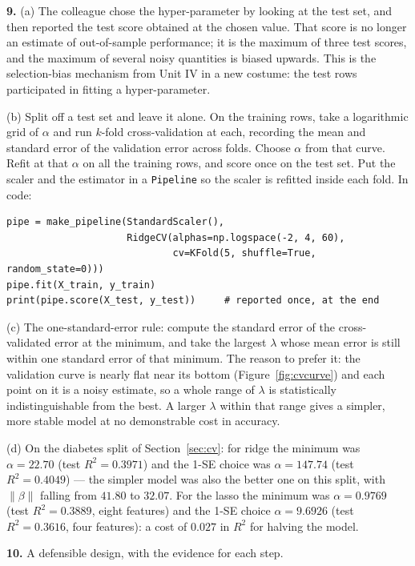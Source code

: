 \documentclass[11pt]{article}
\begin{document}
\medskip
\textbf{9.} (a) The colleague chose the hyper-parameter by looking at the test
set, and then reported the test score obtained at the chosen value. That score
is no longer an estimate of out-of-sample performance; it is the maximum of
three test scores, and the maximum of several noisy quantities is biased
upwards. This is the selection-bias mechanism from Unit IV in a new costume:
the test rows participated in fitting a hyper-parameter.

(b) Split off a test set and leave it alone. On the training rows, take a
logarithmic grid of $\alpha$ and run $k$-fold cross-validation at each,
recording the mean and standard error of the validation error across folds.
Choose $\alpha$ from that curve. Refit at that $\alpha$ on all the training
rows, and score once on the test set. Put the scaler and the estimator in a
\texttt{Pipeline} so the scaler is refitted inside each fold. In code:
\begin{lstlisting}
pipe = make_pipeline(StandardScaler(),
                     RidgeCV(alphas=np.logspace(-2, 4, 60),
                             cv=KFold(5, shuffle=True, random_state=0)))
pipe.fit(X_train, y_train)
print(pipe.score(X_test, y_test))     # reported once, at the end
\end{lstlisting}

(c) The one-standard-error rule: compute the standard error of the
cross-validated error at the minimum, and take the largest $\lambda$ whose
mean error is still within one standard error of that minimum. The reason to
prefer it: the validation curve is nearly flat near its bottom
(Figure~\ref{fig:cvcurve}) and each point on it is a noisy estimate, so a
whole range of $\lambda$ is statistically indistinguishable from the best. A
larger $\lambda$ within that range gives a simpler, more stable model at no
demonstrable cost in accuracy.

(d) On the diabetes split of Section~\ref{sec:cv}: for ridge the minimum was
$\alpha = 22.70$ (test $R^2 = 0.3971$) and the 1-SE choice was
$\alpha = 147.74$ (test $R^2 = 0.4049$) --- the simpler model was also the
better one on this split, with $\|\beta\|$ falling from $41.80$ to $32.07$.
For the lasso the minimum was $\alpha = 0.9769$ (test $R^2 = 0.3889$, eight
features) and the 1-SE choice $\alpha = 9.6926$ (test $R^2 = 0.3616$, four
features): a cost of $0.027$ in $R^2$ for halving the model.

\medskip
\textbf{10.} A defensible design, with the evidence for each step.
\end{document}
